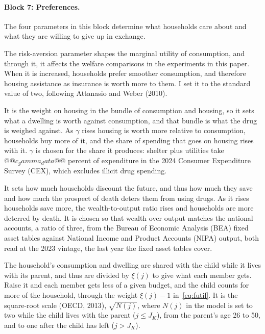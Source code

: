 \documentclass[10pt]{article}
\begin{document}
\paragraph{Block 7: Preferences.}  The four parameters in this block determine what households care about and what they are willing to give up in exchange.
\begin{description}\setlength{\itemsep}{0.25em}\setlength{\parskip}{0em}
\item[$\sigma$, risk aversion.]  The risk-aversion parameter shapes the marginal utility of consumption, and through it, it affects the welfare comparisons in the experiments in this paper. When it is increased, households prefer smoother consumption, and therefore housing assistance as insurance is worth more to them. I set it to the standard value of two, following
Attanasio and Weber (2010).
\item[$\gamma$, the weight on housing services.] It is the weight on housing in the
bundle of consumption and housing, so it sets what a dwelling is worth against
consumption, and that bundle is what the drug is weighed against. As
$\gamma$ rises housing is worth more relative to consumption, households buy more of it,
and the share of spending that goes on housing rises with it. $\gamma$ is chosen for the share
it produces: shelter plus utilities take $@@c_gamma_data@@$ percent of expenditure in the 2024 Consumer Expenditure Survey (CEX), which excludes illicit drug spending.
\item[$\beta$, the discount factor.] It sets how much households discount the
future, and thus how much they save and how much the prospect of death deters them from using drugs. As it rises households save more, the
 wealth-to-output ratio rises and households are more deterred by death. It is chosen so that wealth over output
matches the national accounts, a ratio of three, from the Bureau of Economic Analysis (BEA) fixed asset tables
against National Income and Product Accounts (NIPA) output, both read at the 2023 vintage, the last year the fixed asset tables cover.
\item[$\xi(j)$, the equivalence scale.] The household's consumption and
dwelling are shared with the child while it lives with its parent, and thus are divided by
$\xi(j)$ to give what each member gets. Raise it and each member gets less of a given budget, and the child counts for more of the household, through the weight $\xi(j)-1$ in~\eqref{eq:futil}. It is the square-root scale (OECD, 2013), $\sqrt{N(j)}$, where $N(j)$ in the model is set to two while
the child lives with the parent ($j\le J_K$), from the parent's age 26 to 50, and to one after the child has left ($j>J_K$).
\end{description}
\end{document}
